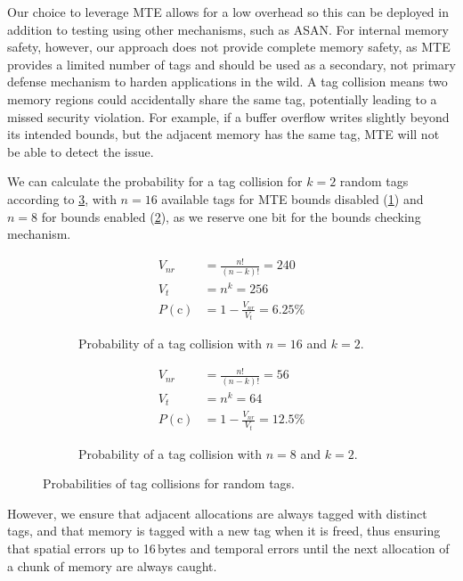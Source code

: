 Our choice to leverage \ac{MTE} allows for a low overhead so this can be deployed in addition to testing using other mechanisms, such as \ac{ASAN}.
For internal memory safety, however, our approach does not provide complete memory safety, as \ac{MTE} provides a limited number of tags and should be used as a secondary, not primary defense mechanism to harden applications in the wild.
A tag collision means two memory regions could accidentally share the same tag, potentially leading to a missed security violation.
For example, if a buffer overflow writes slightly beyond its intended bounds, but the adjacent memory has the same tag, \ac{MTE} will not be able to detect the issue.

We can calculate the probability for a tag collision for $k=2$ random tags according to \cref{fig:tag-collision}, with $n=16$ available tags for \ac{MTE} bounds disabled (\cref{fig:tag-collision-16}) and $n=8$ for bounds enabled (\cref{fig:tag-collision-8}), as we reserve one bit for the bounds checking mechanism.

\begin{figure}[h]
    \centering
    \begin{subfigure}[T]{0.45\textwidth}
        \centering
        \begin{align*}
            V_{nr} &= \frac{n!}{(n - k)!} = 240 \\
            V_t &= n^k = 256 \\
            P(\text{c}) &= 1 - \frac{V_{nr}}{V_t} = 6.25\%
        \end{align*}
        \caption{Probability of a tag collision with $n=16$ and $k=2$.}
        \label{fig:tag-collision-16}
    \end{subfigure}
    \hfill
    \begin{subfigure}[T]{0.45\textwidth}
        \centering
        \begin{align*}
            V_{nr} &= \frac{n!}{(n - k)!} = 56 \\
            V_t &= n^k = 64 \\
            P(\text{c}) &= 1 - \frac{V_{nr}}{V_t} = 12.5\%
        \end{align*}
        \caption{Probability of a tag collision with $n=8$ and $k=2$.}
        \label{fig:tag-collision-8}
    \end{subfigure}
    \caption{Probabilities of tag collisions for random tags.}
    \label{fig:tag-collision}
\end{figure}

However, we ensure that adjacent allocations are always tagged with distinct tags, and that memory is tagged with a new tag when it is freed, thus ensuring that spatial errors up to 16\,bytes and temporal errors until the next allocation of a chunk of memory are always caught.

